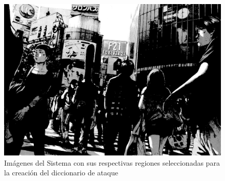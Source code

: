 \begin{figure}[H]
\begin{minipage}[hb]{0.3\textwidth}
		\includegraphics[width=\textwidth]{Graphics/japan-selected-regions.jpg}
	\end{minipage}
	\caption{Imágenes del Sistema con sus respectivas regiones seleccionadas para la creaci\'on del diccionario de ataque}
	\label{fig:selected-points}
\end{figure}


